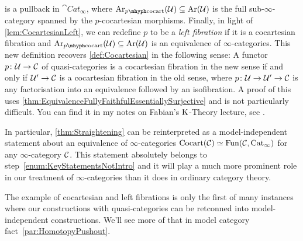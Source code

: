\begin{numpar}
	is a pullback in $\cat{Cat}_\infty$, where $\Ar_{p\mhyph\mathrm{cocart}}(\Uu)\subseteq \Ar(\Uu)$ is the full sub-$\infty$-category spanned by the $p$-cocartesian morphisms. Finally, in light of \cref{lem:CocartesianLeft}, we can redefine $p$ to be a \emph{left fibration} if it is a cocartesian fibration and $\Ar_{p\mhyph\mathrm{cocart}}(\Uu)\subseteq \Ar(\Uu)$ is an equivalence of $\infty$-categories. This new definition recovers \cref{def:Cocartesian} in the following sense: A functor $p\colon \mathcal{U}\rightarrow \mathcal{C}$ of quasi-categories is a cocartesian fibration in the new sense if and only if $\mathcal{U}'\rightarrow \mathcal{C}$ is a cocartesian fibration in the old sense, where $p\colon \mathcal{U}\rightarrow \mathcal{U}'\rightarrow \mathcal{C}$ is any factorisation into an equivalence followed by an isofibration. A proof of this uses \cref{thm:EquivalenceFullyFaithfulEssentiallySurjective} and is not particularly difficult. You can find it in my notes on Fabian's $\operatorname{K}$-Theory lecture, see \cite[Lemma*~\href{https://florianadler.github.io/AlgebraBonn/KTheory.pdf\#smallerdummy.1.24.2}{I.24$b$}]{KTheory}.
	
	In particular, \cref{thm:Straightening} can be reinterpreted as a model-independent statement about an equivalence of $\infty$-categories $\mathrm{Cocart}(\mathcal{C})\simeq \operatorname{Fun}(\mathcal{C},\mathrm{Cat}_\infty)$ for any $\infty$-category $\mathcal{C}$. This statement absolutely belongs to step~\cref{enum:KeyStatementsNotIntro} and it will play a much more prominent role in our treatment of $\infty$-categories than it does in ordinary category theory.
	
	The example of cocartesian and left fibrations is only the first of many instances where our constructions with quasi-categories can be retconned into model-independent constructions. We'll see more of that in model category fact~\cref{par:HomotopyPushout}.
\end{numpar}
